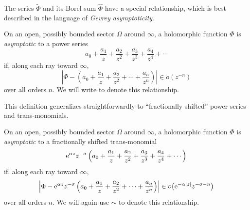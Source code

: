 \documentclass[10pt,a4paper]{amsart}
\newcommand{\series}[1]{\tilde{#1}}
\numberwithin{equation}{section}
\begin{document}
The series $\series{\Phi}$ and its Borel sum $\hat{\Phi}$ have a special relationship, which is best described in the language of {\em Gevrey asymptoticity}.
\begin{Definition}
On an open, possibly bounded sector $\Omega$ around $\infty$, a holomorphic function $\Phi$ is {\em asymptotic} to a power series
\begin{equation}\label{series:asymp-definition}
a_0 + \frac{a_1}{z} + \frac{a_2}{z^2} + \frac{a_3}{z^3} + \frac{a_4}{z^4} + \cdots
\end{equation}
if, along each ray toward $\infty$,
\[ \left|\Phi - \left(a_0 + \frac{a_1}{z} + \frac{a_2}{z^2} + \cdots + \frac{a_n}{z^n} \right) \right| \in o(z^{-n}) \]
over all orders $n$. We will write
to denote this relationship.
\end{Definition}
This definition generalizes straightforwardly to ``fractionally shifted'' power series and trans-monomials.
\begin{Definition}
On an open, possibly bounded sector $\Omega$ around $\infty$, a holomorphic function $\Phi$ is {\em asymptotic} to a fractionally shifted trans-monomial
\[%
{\rm e}^{\alpha z} z^{-\sigma} \left(a_0 + \frac{a_1}{z} + \frac{a_2}{z^2} + \frac{a_3}{z^3} + \frac{a_4}{z^4} + \cdots\right)
\]
if, along each ray toward $\infty$,
\[ \left|\Phi - {\rm e}^{\alpha z} z^{-\sigma} \left(a_0 + \frac{a_1}{z} + \frac{a_2}{z^2} + \cdots + \frac{a_n}{z^n} \right) \right| \in o\bigl({\rm e}^{-\alpha|z|} z^{-\sigma-n}\bigr) \]
over all orders $n$. We will again use $\sim$ to denote this relationship.
\end{Definition}
\end{document}
